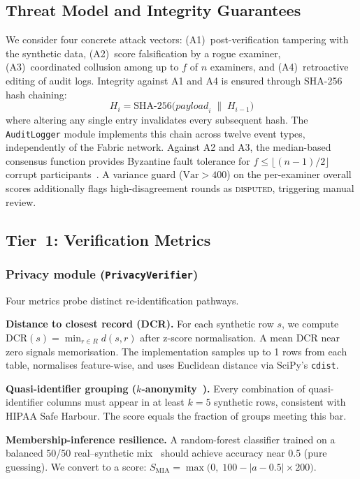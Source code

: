 \subsection{Threat Model and Integrity Guarantees}

We consider four concrete attack vectors: (A1)~post-verification tampering with the synthetic data, (A2)~score falsification by a rogue examiner, (A3)~coordinated collusion among up to $f$ of $n$ examiners, and (A4)~retroactive editing of audit logs. Integrity against A1 and A4 is ensured through SHA-256 hash chaining:
\begin{equation}
H_i = \mathrm{SHA\text{-}256}\!\bigl(\mathit{payload}_i \;\|\; H_{i-1}\bigr)
\label{eq:hash_chain}
\end{equation}
where altering any single entry invalidates every subsequent hash. The \texttt{AuditLogger} module implements this chain across twelve event types, independently of the Fabric network. Against A2 and A3, the median-based consensus function provides Byzantine fault tolerance for $f \le \lfloor(n{-}1)/2\rfloor$ corrupt participants~\cite{lamport1982byzantine}. A variance guard ($\mathrm{Var}>400$) on the per-examiner overall scores additionally flags high-disagreement rounds as \textsc{disputed}, triggering manual review.

\subsection{Tier~1: Verification Metrics}

\subsubsection{Privacy module (\texttt{PrivacyVerifier})}
Four metrics probe distinct re-identification pathways.

\textbf{Distance to closest record (DCR).} For each synthetic row $s$, we compute $\mathrm{DCR}(s)=\min_{r\in R} d(s,r)$ after z-score normalisation. A mean DCR near zero signals memorisation. The implementation samples up to 1 rows from each table, normalises feature-wise, and uses Euclidean distance via SciPy's \texttt{cdist}.

\textbf{Quasi-identifier grouping ($k$-anonymity~\cite{sweeney2002k}).} Every combination of quasi-identifier columns must appear in at least $k{=}5$ synthetic rows, consistent with HIPAA Safe Harbour. The score equals the fraction of groups meeting this bar.

\textbf{Membership-inference resilience.} A random-forest classifier trained on a balanced 50/50 real--synthetic mix~\cite{shokri2017membership} should achieve accuracy near 0.5 (pure guessing). We convert to a score: $S_{\mathrm{MIA}}=\max\!\bigl(0,\;100-|a-0.5|\times200\bigr)$.

